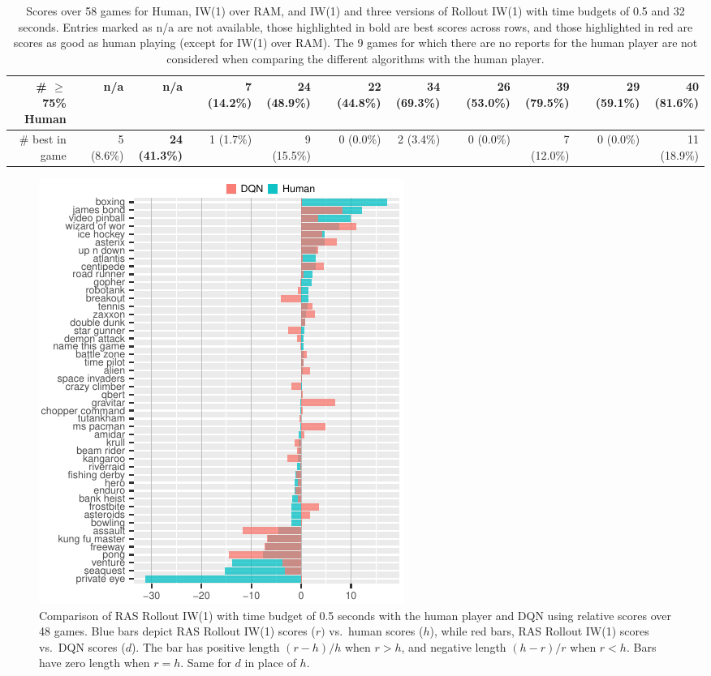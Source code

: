 \documentclass[letterpaper]{article}
\begin{document}
\begin{table}[p]
{\begin{tabular}{@{}rrrrr@{}rr@{}r@{}rr@{}r@{}rr@{}r@{}rr@{}}
        \# $\geq$ 75\% Human &&        n/a &         n/a &&     7 (14.2\%) &    24 (48.9\%) &&    22 (44.8\%) &     34 (69.3\%) &&    26 (53.0\%) &     39 (79.5\%) &&    29 (59.1\%) &\bf  40 (81.6\%) \\
\midrule
             \# best in game &&  5 (8.6\%) &\bf  24 (41.3\%) &&  1 (1.7\%) &     9 (15.5\%) &&      0 (0.0\%) &       2 (3.4\%) &&      0 (0.0\%) &      7 (12.0\%) &&      0 (0.0\%) &     11 (18.9\%) \\
\bottomrule
\end{tabular}
  }
  \caption{
    Scores over 58 games for Human, IW(1) over RAM, and IW(1) and three versions of Rollout IW(1) with time budgets
    of 0.5 and 32 seconds. Entries marked as n/a are not available, those highlighted in bold are best scores across
    rows, and those highlighted in red are scores as good as human playing (except for IW(1) over RAM).
    The 9 games for which there are no reports for the human player are not considered when comparing the 
    different algorithms with the human player.
  }
  \label{table:big2}
\end{table}


\begin{figure}[t]
  \centering
  \includegraphics[width=\columnwidth]{110-15-halfsec-bars}
  \caption{Comparison of RAS Rollout IW(1) with time budget of 0.5 seconds with
    the human player and DQN using relative scores over 48 games.
    Blue bars depict RAS Rollout IW(1) scores ($r)$ vs.\ human scores ($h$), while
    red bars, RAS Rollout IW(1) scores vs.\ DQN scores ($d$). The bar has positive length $(r-h)/h$
    when $r>h$, and negative length $(h-r)/r$ when $r<h$. Bars have zero length when $r=h$.
    Same for $d$ in place of $h$.
  }
  \label{fig:110:bars:half}
\end{figure}
\end{document}
